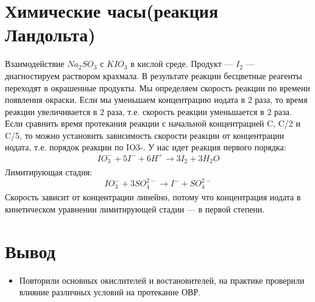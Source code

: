 \documentclass[a4paper, 12pt]{article}
\begin{document}
\section{Химические часы(реакция Ландольта)}
Взаимодействие $Na_2SO_3$ с $KIO_3$ в кислой среде. Продукт — $I_2$ — диагностируем раствором крахмала.
В результате реакции бесцветные реагенты переходят в окрашенные продукты.
Мы определяем скорость реакции по времени появления окраски.
Если мы уменьшаем концентрацию иодата в 2 раза,
то время реакции увеличивается в 2 раза, т.е. скорость реакции уменьшается в 2 раза.
Если сравнить время протекания реакции с начальной концентрацией C, C/2 и C/5, то можно установить зависимость скорости реакции от концентрации иодата, т.е. порядок реакции по IO3-. У нас идет реакция первого порядка:
\begin{equation}
  IO_3^{-} + 5I^{-} +6H^{+} \xrightarrow[]{}  3I_2 + 3H_2O 
\end{equation}
Лимитирующая стадия:
\begin{equation}
  IO_3^{-} + 3SO_4^{2-} \xrightarrow[]{} I^{-} +SO_4^{2-} 
\end{equation}
Скорость зависит от концентрации линейно, потому что концентрация иодата в кинетическом уравнении лимитирующей стадии — в первой степени.
\section{Вывод}
\begin{itemize}
    \item Повторили основных окислителей и востановителей, на практике проверили влияние различных условий на протекание ОВР.
\end{itemize}
\end{document}
